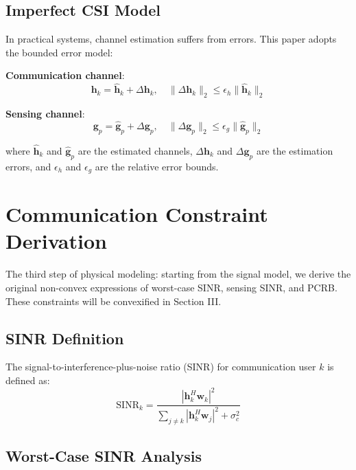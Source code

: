 \documentclass[12pt,a4paper]{article}
\newcommand{\vect}[1]{\mathbf{#1}}
\newcommand{\norm}[1]{\|#1\|_2}
\begin{document}
\subsection{Imperfect CSI Model}

In practical systems, channel estimation suffers from errors. This paper adopts the bounded error model:

\textbf{Communication channel}:
\begin{equation}
\vect{h}_k = \hat{\vect{h}}_k + \Delta\vect{h}_k, \quad \norm{\Delta\vect{h}_k} \leq \epsilon_h \norm{\hat{\vect{h}}_k}
\end{equation}

\textbf{Sensing channel}:
\begin{equation}
\vect{g}_p = \hat{\vect{g}}_p + \Delta\vect{g}_p, \quad \norm{\Delta\vect{g}_p} \leq \epsilon_g \norm{\hat{\vect{g}}_p}
\end{equation}

where $\hat{\vect{h}}_k$ and $\hat{\vect{g}}_p$ are the estimated channels, $\Delta\vect{h}_k$ and $\Delta\vect{g}_p$ are the estimation errors, and $\epsilon_h$ and $\epsilon_g$ are the relative error bounds.

\section{Communication Constraint Derivation}

The third step of physical modeling: starting from the signal model, we derive the original non-convex expressions of worst-case SINR, sensing SINR, and PCRB. These constraints will be convexified in Section III.

\subsection{SINR Definition}

The signal-to-interference-plus-noise ratio (SINR) for communication user $k$ is defined as:
\begin{equation}
\text{SINR}_k = \frac{|\vect{h}_k^H \vect{w}_k|^2}{\sum_{j \neq k} |\vect{h}_k^H \vect{w}_j|^2 + \sigma_c^2} \tag{1}
\end{equation}

\subsection{Worst-Case SINR Analysis}
\end{document}

